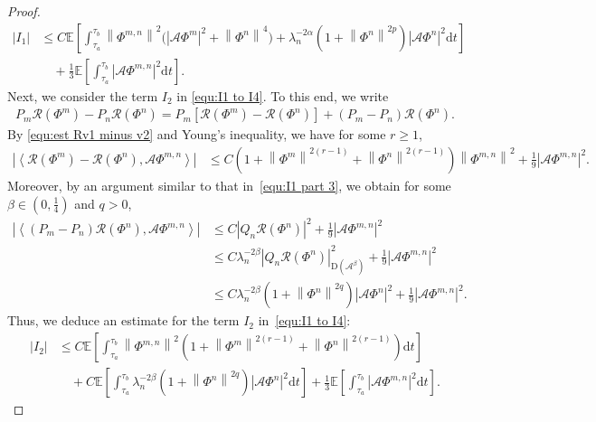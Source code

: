 \documentclass[11pt, reqno]{amsart}
\theoremstyle{definition}
\numberwithin{equation}{section}
\newcommand{\bb}{\mathbb}
\newcommand{\dt}{\mathrm{d}t}
\newcommand{\norm}[1]{\left\|{#1}\right\|}
\newcommand{\inpro}[2]{\left\langle#1,#2\right\rangle}
\newcommand{\abs}[1]{\left|{#1}\right|}
\begin{document}
\begin{proof}
\begin{align}\label{equ:est I1}
	\abs{I_1}
	&\leq
	C \bb{E}\left[ \int_{\tau_a}^{\tau_b} \norm{\Phi^{m,n}}^2 \Big( \abs{\mathcal{A} \Phi^{m}}^2 + \norm{\Phi^n}^4 \Big) 
	+ \lambda_n^{-2\alpha} \left(1+\norm{\Phi^n}^{2p}\right) \abs{\mathcal{A}\Phi^n}^2  \dt \right]
	\nonumber\\
	&\quad 
	+
	\frac13 \bb{E} \left[ \int_{\tau_a}^{\tau_b} \abs{\mathcal{A} \Phi^{m,n}}^2 \dt\right].
\end{align}
Next, we consider the term $I_2$ in \eqref{equ:I1 to I4}. To this end, we write
\begin{align*}
	P_m \mathcal{R}(\Phi^m)- P_n \mathcal{R}(\Phi^n)
	=
	P_m \left[\mathcal{R}(\Phi^m)- \mathcal{R}(\Phi^n)\right] + (P_m-P_n) \mathcal{R}(\Phi^n).
\end{align*}
By \eqref{equ:est Rv1 minus v2} and Young's inequality, we have {for some $r\geq 1$,}
\begin{align}\label{equ:I2 part 1}
	\abs{\inpro{\mathcal{R}(\Phi^m)- \mathcal{R}(\Phi^n)}{\mathcal{A} \Phi^{m,n}}}
	&\leq
	C \left(1+ \norm{\Phi^m}^{2(r-1)}+ \norm{\Phi^n}^{2(r-1)} \right) \norm{\Phi^{m,n}}^2 + \frac19 \abs{\mathcal{A} \Phi^{m,n}}^2.
\end{align}
Moreover, by an argument similar to that in~\eqref{equ:I1 part 3}, we obtain {for some $\beta\in (0,\frac14)$ and $q>0$,}
\begin{align}\label{equ:I2 part 2}
	\abs{\inpro{(P_m-P_n) \mathcal{R}(\Phi^n)}{\mathcal{A} \Phi^{m,n}}}
	&\leq
	C \abs{Q_n \mathcal{R}(\Phi^n)}^2
	+
	\frac19 \abs{\mathcal{A} \Phi^{m,n}}^2 
	\nonumber\\
	&\leq
	C \lambda_n^{-2\beta} \abs{Q_n \mathcal{R}(\Phi^n)}_{\mathrm{D}(\mathcal{A}^{\beta})}^2 + \frac19 \abs{\mathcal{A} \Phi^{m,n}}^2 
	\nonumber\\
	&\leq
	C\lambda_n^{-2\beta} \left(1+ \norm{\Phi^n}^{2q} \right) \abs{\mathcal{A} \Phi^n}^2 
	+
	\frac19 \abs{\mathcal{A} \Phi^{m,n}}^2.
\end{align}
Thus, we deduce an estimate for the term $I_2$ in~\eqref{equ:I1 to I4}:
\begin{align}\label{equ:est I2}
	\abs{I_2} 
	&\leq
	C \bb{E}\left[ \int_{\tau_a}^{\tau_b} \norm{\Phi^{m,n}}^2 \left( 1+ \norm{\Phi^m}^{2(r-1)} + \norm{\Phi^n}^{2(r-1)}  \right) \dt \right]
	\nonumber\\
	&\quad
	+
	C\bb{E} \left[ \int_{\tau_a}^{\tau_b} \lambda_n^{-2\beta} \left(1+ \norm{\Phi^n}^{2q} \right) \abs{\mathcal{A} \Phi^n}^2 \dt \right]
	+
	\frac13 \bb{E} \left[ \int_{\tau_a}^{\tau_b} \abs{\mathcal{A} \Phi^{m,n}}^2 \dt\right].

\end{align}
\end{proof}
\end{document}
